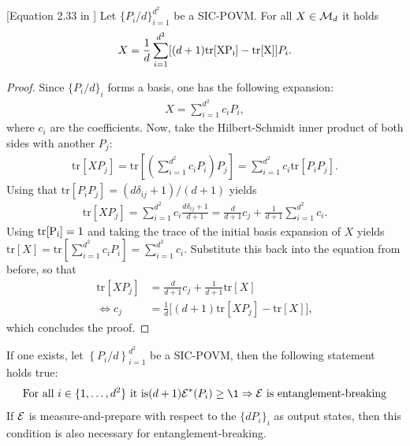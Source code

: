 \begin{lemma}\label{lem:sic}[Equation 2.33 in \cite{wolf2012quantum}] Let $\{P_i/d\}_{i=1}^{d^2}$ be a SIC-POVM. For all $X \in \mathcal M_d$ it holds 
\begin{align*}
    X = \frac{1}{d}\sum_{i=1}^{d^2}[(d+1)\mathrm{tr[X P_i]}-\mathrm{tr[X]}]P_i.
\end{align*}
\end{lemma}
\begin{proof}
Since $\{P_i/d\}_i$ forms a basis, one has the following expansion:
\begin{align*}
    X = \sum_{i=1}^{d^2} c_i P_i,
\end{align*}
where $c_i$ are the coefficients. Now, take the Hilbert-Schmidt inner product of both sides with another $P_j$:
\begin{align*}
    \mathrm{tr}[X P_j] = \mathrm{tr}\left[ \left( \sum_{i=1}^{d^2} c_i P_i \right) P_j \right] = \sum_{i=1}^{d^2} c_i \mathrm{tr}[P_i P_j].
\end{align*}
Using that $
    \mathrm{tr}[P_i P_j] = (d\delta_{ij} + 1)/(d+1)$
yields
\begin{align*} \label{eq:trace_pj}
    \mathrm{tr}[X P_j] = \sum_{i=1}^{d^2} c_i  \frac{d\delta_{ij} + 1}{d+1}  = \frac{d}{d+1}c_j + \frac{1}{d+1}\sum_{i=1}^{d^2} c_i.
\end{align*}
Using $\mathrm{tr[P_i]}=1$ and taking the trace of the initial basis expansion of $X$ yields $
    \mathrm{tr}[X] = \mathrm{tr}\left[ \sum_{i=1}^{d^2} c_i P_i \right] = \sum_{i=1}^{d^2} c_i$.
Substitute this back into the equation from before, so that
\begin{align*}
    \mathrm{tr}[X P_j] &= \frac{d}{d+1}c_j + \frac{1}{d+1}\mathrm{tr}[X] \\\Leftrightarrow 
    c_j &= \frac{1}{d} \big[ (d+1)\mathrm{tr}[X P_j] - \mathrm{tr}[X] \big],
\end{align*}
which concludes the proof.
\end{proof}
\begin{prop}\label{prop:sic}
     If one exists, let $\left\{ P_i/d \right\}_{i=1}^{d^2}$ be a SIC-POVM, then the following statement holds true:
     \begin{align*}
        \text{For all }i \in \{1, \dots, d^2\} \text{ it is}(d+1)\mathcal{E}^*(P_i) \ge \1 \Rightarrow \m E\text{ is entanglement-breaking}
     \end{align*}
 If $\mathcal E$ is measure-and-prepare with respect to the $\{d P_i\}_i$ as output states, then this condition is also necessary for entanglement-breaking.
\end{prop}
